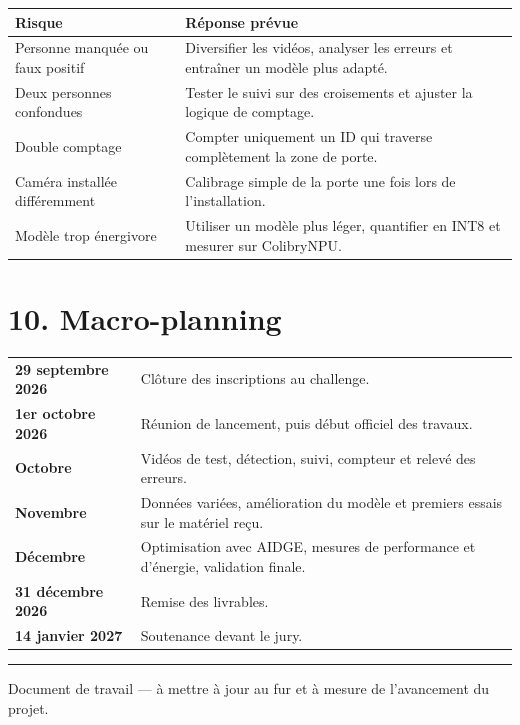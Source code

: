 \documentclass[11pt,a4paper]{article}
\begin{document}
\begin{tabular}{>{\raggedright\arraybackslash}p{} >{\raggedright\arraybackslash}p{}}
\textbf{Risque} & \textbf{Réponse prévue} \\ \hline
Personne manquée ou faux positif & Diversifier les vidéos, analyser les erreurs et entraîner un modèle plus adapté. \\
Deux personnes confondues & Tester le suivi sur des croisements et ajuster la logique de comptage. \\
Double comptage & Compter uniquement un ID qui traverse complètement la zone de porte. \\
Caméra installée différemment & Calibrage simple de la porte une fois lors de l'installation. \\
Modèle trop énergivore & Utiliser un modèle plus léger, quantifier en INT8 et mesurer sur ColibryNPU. \\
\end{tabular}

\section*{10. Macro-planning}

\begin{tabular}{>{\raggedright\arraybackslash}p{} >{\raggedright\arraybackslash}p{}}
\textbf{29 septembre 2026} & Clôture des inscriptions au challenge. \\
\textbf{1er octobre 2026} & Réunion de lancement, puis début officiel des travaux. \\
\textbf{Octobre} & Vidéos de test, détection, suivi, compteur et relevé des erreurs. \\
\textbf{Novembre} & Données variées, amélioration du modèle et premiers essais sur le matériel reçu. \\
\textbf{Décembre} & Optimisation avec AIDGE, mesures de performance et d'énergie, validation finale. \\
\textbf{31 décembre 2026} & Remise des livrables. \\
\textbf{14 janvier 2027} & Soutenance devant le jury. \\
\end{tabular}

\vfill
\noindent\rule{\textwidth}{0.4pt}
\small Document de travail --- à mettre à jour au fur et à mesure de l'avancement du projet.
\end{document}
